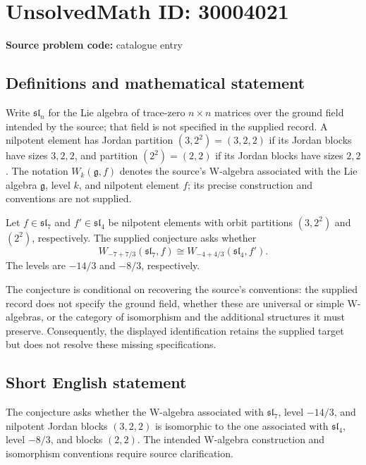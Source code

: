 \documentclass[11pt]{article}
\begin{document}
\section*{UnsolvedMath ID: 30004021}
\textbf{Source problem code:} catalogue entry
\subsection{Definitions and mathematical statement}
Write \(\mathfrak{sl}_n\) for the Lie algebra of trace-zero \(n\times n\) matrices over the ground field intended by the source; that field is not specified in the supplied record. A nilpotent element has Jordan partition \((3,2^2)=(3,2,2)\) if its Jordan blocks have sizes \(3,2,2\), and partition \((2^2)=(2,2)\) if its Jordan blocks have sizes \(2,2\). The notation \(W_k(\mathfrak g,f)\) denotes the source's W-algebra associated with the Lie algebra \(\mathfrak g\), level \(k\), and nilpotent element \(f\); its precise construction and conventions are not supplied.

Let \(f\in\mathfrak{sl}_7\) and \(f'\in\mathfrak{sl}_4\) be nilpotent elements with orbit partitions \((3,2^2)\) and \((2^2)\), respectively. The supplied conjecture asks whether
\[
W_{-7+7/3}(\mathfrak{sl}_7,f)
\cong
W_{-4+4/3}(\mathfrak{sl}_4,f').
\]
The levels are \(-14/3\) and \(-8/3\), respectively.

The conjecture is conditional on recovering the source's conventions: the supplied record does not specify the ground field, whether these are universal or simple W-algebras, or the category of isomorphism and the additional structures it must preserve. Consequently, the displayed identification retains the supplied target but does not resolve these missing specifications.
\subsection{Short English statement}
The conjecture asks whether the W-algebra associated with \(\mathfrak{sl}_7\), level \(-14/3\), and nilpotent Jordan blocks \((3,2,2)\) is isomorphic to the one associated with \(\mathfrak{sl}_4\), level \(-8/3\), and blocks \((2,2)\). The intended W-algebra construction and isomorphism conventions require source clarification.
\end{document}
